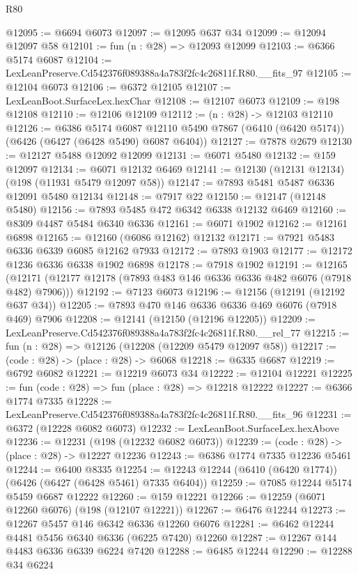 \begin{lexlean}{R80}
\begin{coremodule}
@12095 := @6694 @6073
@12097 := @12095 @637 @34
@12099 := @12094 @12097 @58
@12101 := fun (n : @28) => @12093 @12099
@12103 := @6366 @5174 @6087
@12104 := LexLeanPreserve.Cd542376f089388a4a783f2fc4c26811f.R80.__fits_97
@12105 := @12104 @6073
@12106 := @6372 @12105
@12107 := LexLeanBoot.SurfaceLex.hexChar
@12108 := @12107 @6073
@12109 := @198 @12108
@12110 := @12106 @12109
@12112 := (n : @28) -> @12103 @12110
@12126 := @6386
    @5174
    @6087
    @12110
    @5490
    @7867
    (@6410 (@6420 @5174))
    (@6426 (@6427 (@6428 @5490) @6087 @6404))
@12127 := @7878 @2679
@12130 := @12127 @5488 @12092 @12099
@12131 := @6071 @5480
@12132 := @159 @12097
@12134 := @6071 @12132 @6469
@12141 := @12130 (@12131 @12134) (@198 (@11931 @5479 @12097 @58))
@12147 := @7893 @5481 @5487 @6336 @12091 @5480 @12134
@12148 := @7917 @22
@12150 := @12147 (@12148 @5480)
@12156 := @7893 @5485 @472 @6342 @6338 @12132 @6469
@12160 := @8309 @4487 @5484 @6340 @6336
@12161 := @6071 @1902
@12162 := @12161 @6898
@12165 := @12160 (@6086 @12162) @12132
@12171 := @7921 @5483 @6336 @6339 @6085 @12162 @7933
@12172 := @7893 @1903
@12177 := @12172 @1236 @6336 @6338 @1902 @6898
@12178 := @7918 @1902
@12191 := @12165
    (@12171 (@12177 @12178 (@7893 @483 @146 @6336 @6336 @482 @6076 (@7918 @482) @7906)))
@12192 := @7123 @6073
@12196 := @12156 (@12191 (@12192 @637 @34))
@12205 := @7893 @470 @146 @6336 @6336 @469 @6076 (@7918 @469) @7906
@12208 := @12141 (@12150 (@12196 @12205))
@12209 := LexLeanPreserve.Cd542376f089388a4a783f2fc4c26811f.R80.__rel_77
@12215 := fun (n : @28) => @12126 (@12208 (@12209 @5479 @12097 @58))
@12217 := (code : @28) -> (place : @28) -> @6068
@12218 := @6335 @6687
@12219 := @6792 @6082
@12221 := @12219 @6073 @34
@12222 := @12104 @12221
@12225 := fun (code : @28) => fun (place : @28) => @12218 @12222
@12227 := @6366 @1774 @7335
@12228 := LexLeanPreserve.Cd542376f089388a4a783f2fc4c26811f.R80.__fits_96
@12231 := @6372 (@12228 @6082 @6073)
@12232 := LexLeanBoot.SurfaceLex.hexAbove
@12236 := @12231 (@198 (@12232 @6082 @6073))
@12239 := (code : @28) -> (place : @28) -> @12227 @12236
@12243 := @6386 @1774 @7335 @12236 @5461
@12244 := @6400 @8335
@12254 := @12243 @12244 (@6410 (@6420 @1774)) (@6426 (@6427 (@6428 @5461) @7335 @6404))
@12259 := @7085 @12244 @5174 @5459 @6687 @12222
@12260 := @159 @12221
@12266 := @12259 (@6071 @12260 @6076) (@198 (@12107 @12221))
@12267 := @6476 @12244
@12273 := @12267 @5457 @146 @6342 @6336 @12260 @6076
@12281 := @6462 @12244 @4481 @5456 @6340 @6336 (@6225 @7420) @12260
@12287 := @12267 @144 @4483 @6336 @6339 @6224 @7420
@12288 := @6485 @12244
@12290 := @12288 @34 @6224

\end{coremodule}
\end{lexlean}
